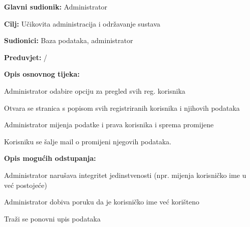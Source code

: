 						\begin{packed_item}
						
						\item \textbf{Glavni sudionik: } Administrator
						\item  \textbf{Cilj:} Učikovita administracija i održavanje sustava
						\item  \textbf{Sudionici:} Baza podataka, administrator
						\item  \textbf{Preduvjet:}  / 
						\item  \textbf{Opis osnovnog tijeka:}
						
						\item[] \begin{packed_enum}
							\item Administrator odabire opciju za pregled svih reg. korisnika
							\item Otvara se stranica s popisom svih registriranih korisnika i njihovih podataka
							\item Administrator mijenja podatke i prava korisnika i sprema promijene			
							\item Korisniku se šalje mail o promijeni njegovih podataka.
						\end{packed_enum}
						
						\item  \textbf{Opis mogućih odstupanja:}
						
						\item[] \begin{packed_item}
							
							\item[3.a]Administrator narušava integritet jedinstvenosti (npr. mijenja korisničko ime u već postojeće)
							\item[] \begin{packed_enum}
								
								\item Administrator dobiva poruku da je korisničko ime već korišteno
								\item Traži se ponovni upis podataka
								
							\end{packed_enum}
								
							\end{packed_item}
							
						\end{packed_item}
						

